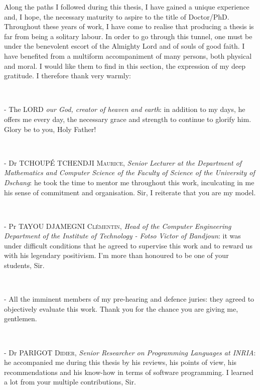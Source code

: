 Along the paths I followed during this thesis, I have gained a unique experience and, I hope, the necessary maturity to aspire to the title of Doctor/PhD. Throughout these years of work, I have come to realise that producing a thesis is far from being a solitary labour. In order to go through this tunnel, one must be under the benevolent escort of the Almighty Lord and of souls of good faith. I have benefited from a multiform accompaniment of many persons, both physical and moral. I would like them to find in this section, the expression of my deep gratitude. I therefore thank very warmly:

~

\noindent- The \textsc{LORD} \textit{our God, creator of heaven and earth}: in addition to my days, he offers me every day, the necessary grace and strength to continue to glorify him. Glory be to you, Holy Father!

~

\noindent- Dr \textsc{TCHOUP{\'E} TCHENDJI Maurice}, \textit{Senior Lecturer at the Department of Mathematics and Computer Science of the Faculty of Science of the University of Dschang}: he took the time to mentor me throughout this work, inculcating in me his sense of commitment and organisation. Sir, I reiterate that you are my model.

~

\noindent- Pr \textsc{TAYOU DJAMEGNI Cl{\'e}mentin}, \textit{Head of the Computer Engineering Department of the Institute of Technology - Fotso Victor of Bandjoun}: it was under difficult conditions that he agreed to supervise this work and to reward us with his legendary positivism. I'm more than honoured to be one of your students, Sir.

~

\noindent- All the imminent members of my pre-hearing and defence juries: they agreed to objectively evaluate this work. Thank you for the chance you are giving me, gentlemen.

~

\noindent- Dr \textsc{PARIGOT Didier}, \textit{Senior Researcher on Programming Languages at INRIA}: he accompanied me during this thesis by his reviews, his points of view, his recommendations and his know-how in terms of software programming. I learned a lot from your multiple contributions, Sir.

